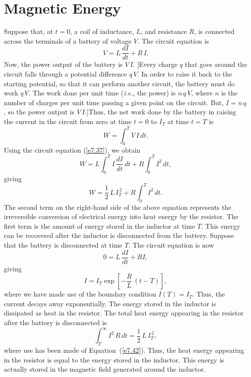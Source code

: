 \section{Magnetic Energy}
Suppose that, at $t=0$, a coil of inductance, $L$, and resistance $R$, is connected
across the terminals of a battery of voltage $V$. The circuit equation is
\begin{equation}\label{e7.37}
V = L\,\frac{d I}{dt} + R\,I.
\end{equation}
Now, the power output of the battery is $V\,I$. [Every charge $q$ that goes around the circuit
falls through a potential difference $q \,V$. In order to raise it back to
the starting potential, so that it can perform another circuit, the battery must do
work $q\,V$. The work done per unit time ({\em i.e.}, the power) is $n\,q\,V$, where $n$ is
the number of charges per unit time passing a given point on the circuit. 
But, $I=n\,q$, so the power output is $V\,I$.]\@ Thus, the net work done by the battery in
raising the current in the circuit from zero at time $t=0$ to $I_T$ at
time $t=T$ is 
\begin{equation}
W = \int_0^T V\,I \,dt.
\end{equation}
Using the circuit equation (\ref{e7.37}), we obtain
\begin{equation}
W = L \int_0^T I\,\frac{dI}{dt} \,dt + R \int_0^T I^2\,dt,
\end{equation}
giving
\begin{equation}
W = \frac{1}{2}\, L\, I_T^{\,2} + R \int_0^T I^2\,dt. 
\end{equation}
The second term on the right-hand side of the above equation represents the irreversible conversion of
electrical energy into heat energy by the resistor. The first term is the amount of
energy stored in the inductor at time $T$. This energy can be recovered after the
inductor is disconnected from the battery. Suppose that the battery is disconnected
at time $T$. The circuit equation is now
\begin{equation}
0 = L\,\frac{dI}{dt} + RI,
\end{equation}
giving 
\begin{equation}\label{e7.42}
I= I_T \exp \left[ - \frac{R}{L} \,(t-T)\right],
\end{equation}
where we have made use of the boundary condition $I(T) = I_T$. 
Thus, the current
decays away exponentially. The energy stored in the inductor is dissipated as
heat in the resistor. The total heat energy appearing in the resistor after the
battery is disconnected is
\begin{equation}
\int_T^\infty I^2 \,R \,dt = \frac{1}{2}\, L\, I_T^{\,2},
\end{equation}
where use has been made of Equation~(\ref{e7.42}). 
Thus, the heat energy appearing in the resistor is equal to the
energy stored in the inductor. This energy is actually stored in the magnetic
field generated around the inductor. 

